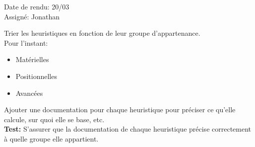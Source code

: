 \documentclass{article}
\begin{document}
\begin{needbox}
    \begin{duedatebox}
        Date de rendu: 20/03\\
        Assigné: Jonathan
    \end{duedatebox}
    \begin{subneedbox}
        Trier les heuristiques en fonction de leur groupe d'appartenance.\\
        Pour l'instant:
        \begin{itemize}
            \item Matérielles
            \item Positionnelles
            \item Avancées
        \end{itemize}
    \end{subneedbox}
    \begin{subneedbox}
        Ajouter une documentation pour chaque heuristique pour préciser ce qu'elle calcule, sur quoi 
        elle se base, etc.\\
        \textbf{Test:} S'assurer que la documentation de chaque heuristique précise correctement à quelle groupe elle appartient.
    \end{subneedbox}

\end{needbox}
\end{document}
